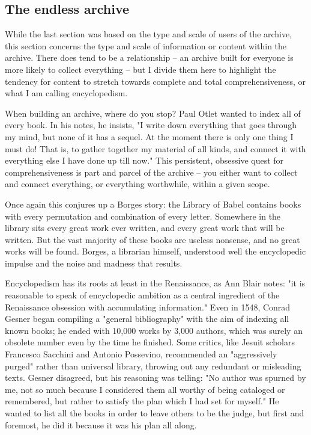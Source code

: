 \subsection{The endless archive}

While the last section was based on the type and scale of users of the archive, this section concerns the type and scale of information or content within the archive. There does tend to be a relationship – an archive built for everyone is more likely to collect everything – but I divide them here to highlight the tendency for content to stretch towards complete and total comprehensiveness, or what I am calling encyclopedism.

When building an archive, where do you stop? Paul Otlet wanted to index all of every book. In his notes, he insists, "I write down everything that goes through my mind, but none of it has a sequel. At the moment there is only one thing I must do! That is, to gather together my material of all kinds, and connect it with everything else I have done up till now."  This persistent, obsessive quest for comprehensiveness is part and parcel of the archive – you either want to collect and connect everything, or everything worthwhile, within a given scope.

Once again this conjures up a Borges story: the Library of Babel contains books with every permutation and combination of every letter. Somewhere in the library sits every great work ever written, and every great work that will be written. But the vast majority of these books are useless nonsense, and no great works will be found. Borges, a librarian himself, understood well the encyclopedic impulse and the noise and madness that results. 

Encyclopedism has its roots at least in the Renaissance, as Ann Blair notes: "it is reasonable to speak of encyclopedic ambition as a central ingredient of the Renaissance obsession with accumulating information."  Even in 1548, Conrad Gesner began compiling a "general bibliography" with the aim of indexing all known books; he ended with 10,000 works by 3,000 authors, which was surely an obsolete number even by the time he finished.  Some critics, like Jesuit scholars Francesco Sacchini and Antonio Possevino, recommended an "aggressively purged" rather than universal library, throwing out any redundant or misleading texts. Gesner disagreed, but his reasoning was telling: "No author was spurned by me, not so much because I considered them all worthy of being cataloged or remembered, but rather to satisfy the plan which I had set for myself."  He wanted to list all the books in order to leave others to be the judge, but first and foremost, he did it because it was his plan all along.


